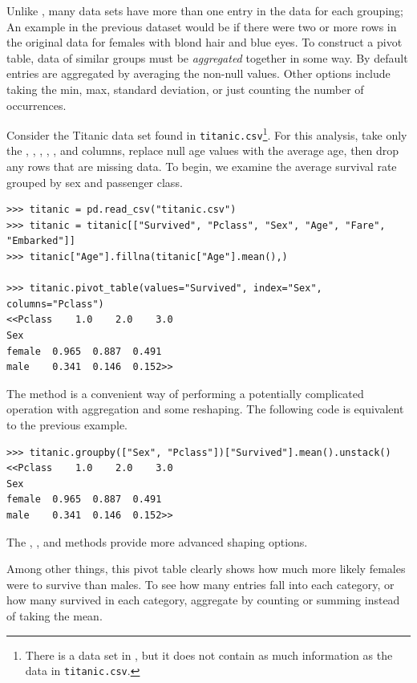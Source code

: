 Unlike , many data sets have more than one entry in the data for each grouping;
An example in the previous dataset would be if there were two or more rows in the original data for females with blond hair and blue eyes.
To construct a pivot table, data of similar groups must be \emph{aggregated} together in some way.
By default entries are aggregated by averaging the non-null values.
Other options include taking the min, max, standard deviation, or just counting the number of occurrences.

Consider the Titanic data set found in \texttt{titanic.csv}\footnote{There is a  data set in , but it does not contain as much information as the data in \texttt{titanic.csv}.}.
For this analysis, take only the , , , , , and  columns, replace null age values with the average age, then drop any rows that are missing data.
To begin, we examine the average survival rate grouped by sex and passenger class.

\begin{lstlisting}
>>> titanic = pd.read_csv("titanic.csv")
>>> titanic = titanic[["Survived", "Pclass", "Sex", "Age", "Fare", "Embarked"]]
>>> titanic["Age"].fillna(titanic["Age"].mean(),)

>>> titanic.pivot_table(values="Survived", index="Sex", columns="Pclass")
<<Pclass    1.0    2.0    3.0
Sex
female  0.965  0.887  0.491
male    0.341  0.146  0.152>>
\end{lstlisting}

\begin{info} %
The  method is a convenient way of performing a potentially complicated  operation with aggregation and some reshaping.
The following code is equivalent to the previous example.

\begin{lstlisting}
>>> titanic.groupby(["Sex", "Pclass"])["Survived"].mean().unstack()
<<Pclass    1.0    2.0    3.0
Sex
female  0.965  0.887  0.491
male    0.341  0.146  0.152>>
\end{lstlisting}

The , , and  methods provide more advanced shaping options.
\end{info}

Among other things, this pivot table clearly shows how much more likely females were to survive than males.
To see how many entries fall into each category, or how many survived in each category, aggregate by counting or summing instead of taking the mean.

